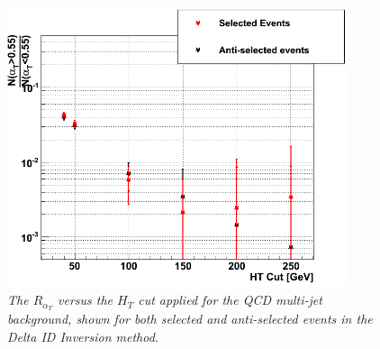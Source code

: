 \documentclass[12pt]{article}
\begin{document}
\begin{figure}[h!]
\begin{center}
\includegraphics[width=100mm]{leptonicalphaT/AlphaTRatio}
\end{center}
\caption{\textit{The $R_{\alpha_T}$ versus the $H_{T}$ cut applied for the QCD multi-jet background, shown for both selected and anti-selected events in the Delta ID Inversion method.}}
\label{fig:AlphaT_Ratio}
\end{figure}
\end{document}
